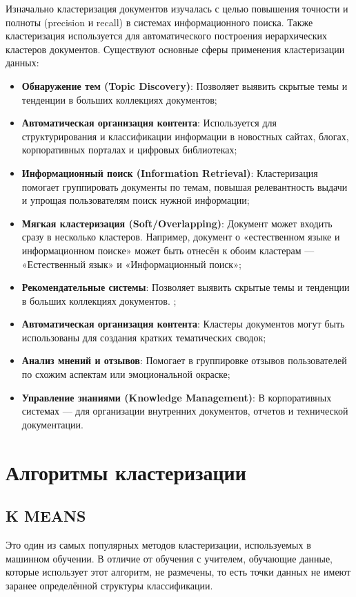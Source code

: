 Изначально кластеризация документов изучалась с целью повышения точности и полноты (precision и recall) в системах информационного поиска. Также кластеризация используется для автоматического построения иерархических кластеров документов.
Существуют основные сферы применения кластеризации данных:
\begin{itemize}
   \item \textbf{Обнаружение тем (Topic Discovery)}:
       Позволяет выявить скрытые темы и тенденции в больших коллекциях документов;
    \item \textbf{Автоматическая организация контента}:
       Используется для структурирования и классификации информации в новостных сайтах, блогах, корпоративных порталах и цифровых библиотеках;
    \item \textbf{Информационный поиск (Information Retrieval)}:
       Кластеризация помогает группировать документы по темам, повышая релевантность выдачи и упрощая пользователям поиск нужной информации;
    \item \textbf{Мягкая кластеризация (Soft/Overlapping)}:
        Документ может входить сразу в несколько кластеров. Например, документ о «естественном языке и информационном поиске» может быть отнесён к обоим кластерам — «Естественный язык» и «Информационный поиск»;
    \item \textbf{Рекомендательные системы}:
    Позволяет выявить скрытые темы и тенденции в больших коллекциях документов.  ;
    \item \textbf{Автоматическая организация контента}:
       Кластеры документов могут быть использованы для создания кратких тематических сводок;
    \item \textbf{Анализ мнений и отзывов}:
    Помогает в группировке отзывов пользователей по схожим аспектам или эмоциональной окраске;
    \item \textbf{Управление знаниями (Knowledge Management)}:
    В корпоративных системах — для организации внутренних документов, отчетов и технической документации.
\end{itemize}
\section{Алгоритмы кластеризации}
    
\subsection{K MEANS}

Это один из самых популярных методов кластеризации, используемых в машинном обучении. В отличие от обучения с учителем, обучающие данные, которые использует этот алгоритм, не размечены, то есть точки данных не имеют заранее определённой структуры классификации.

